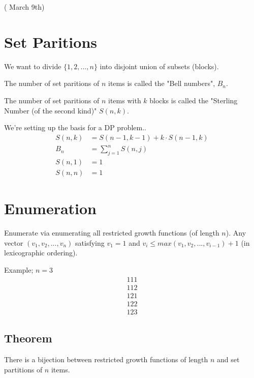 \documentclass{article}
\begin{document}
( March 9th)
\section*{Set Paritions}
We want to divide $\{1,2,...,n\}$ into disjoint union of subsets (blocks). 

The number of set paritions of $n$ items is called the "Bell numbers", $B_n$.

The number of set paritions of $n$ items with $k$ blocks is called the "Sterling Number (of the second kind)" $S(n,k)$.

We're setting up the basis for a DP problem..
\begin{align*}
				S(n, k) &= S(n-1, k-1) + k \cdot S(n-1, k) \\
				B_n &= \sum_{j=1}^{n} S(n,j) \\
				S(n,1) &= 1 \\
				S(n,n) &= 1
\end{align*}

\section*{Enumeration}
Enumerate via enumerating all restricted growth functions (of length $n$). Any vector $(v_1, v_2, ..., v_n)$ satisfying $v_1 = 1$ and $v_i \leq max(v_1, v_2, ..., v_{i-1}) + 1$ (in lexicographic ordering).

Example; $n=3$
\begin{align*}
   1 1 1 \\ 
   1 1 2 \\
   1 2 1 \\
   1 2 2 \\
   1 2 3
\end{align*}

\subsection*{Theorem}
There is a bijection between restricted growth functions of length $n$ and set partitions of $n$ items.
\end{document}
